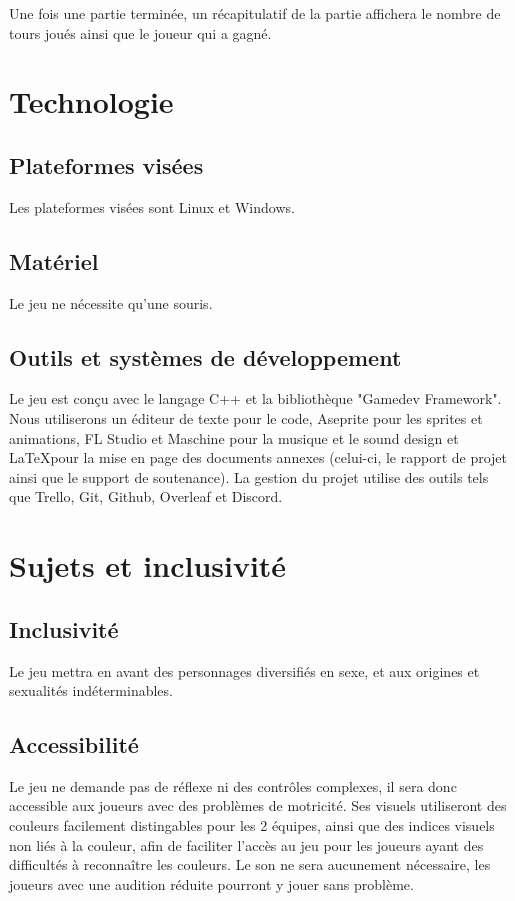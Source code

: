 \documentclass[a4paper]{scrreprt}
\begin{document}
Une fois une partie terminée, un récapitulatif de la partie affichera le nombre de tours joués ainsi que le joueur qui a gagné.



\chapter{Technologie}


\section{Plateformes visées}
Les plateformes visées sont Linux et Windows.

\section{Matériel}

Le jeu ne nécessite qu'une souris.

\section{Outils et systèmes de développement}
Le jeu est conçu avec le langage C++ et la bibliothèque "Gamedev Framework". 
Nous utiliserons un éditeur de texte pour le code, Aseprite pour les sprites et animations, FL Studio et Maschine pour la musique et le sound design et \LaTeX pour la mise en page des documents annexes (celui-ci, le rapport de projet ainsi que le support de soutenance).
La gestion du projet utilise des outils tels que Trello, Git, Github, Overleaf et Discord.



\chapter{Sujets et inclusivité}

\section{Inclusivité}

Le jeu mettra en avant des personnages diversifiés en sexe, et aux origines et sexualités indéterminables.

\section{Accessibilité}
Le jeu ne demande pas de réflexe ni des contrôles complexes, il sera donc accessible aux joueurs avec des problèmes de motricité.
Ses visuels utiliseront des couleurs facilement distingables pour les 2 équipes, ainsi que des indices visuels non liés à la couleur, afin de faciliter l'accès au jeu pour les joueurs ayant des difficultés à reconnaître les couleurs.
Le son ne sera aucunement nécessaire, les joueurs avec une audition réduite pourront y jouer sans problème.
\end{document}
